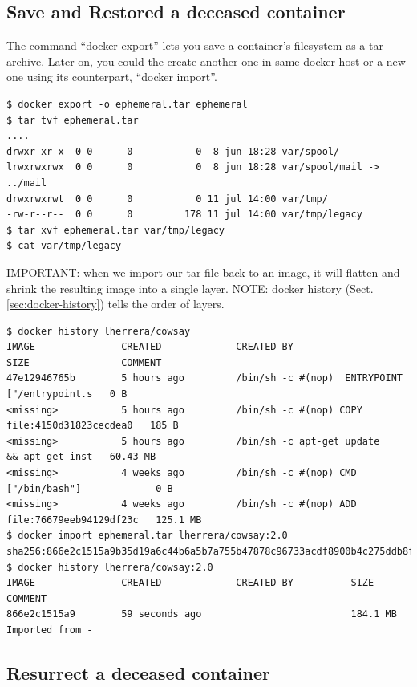 \subsection{Save and Restored a deceased container}


The command “docker export” lets you save a container’s filesystem as a tar
archive. Later on, you could the create another one in same docker host or a new
one using its counterpart, “docker import”.

\begin{verbatim}
$ docker export -o ephemeral.tar ephemeral
$ tar tvf ephemeral.tar 
....
drwxr-xr-x  0 0      0           0  8 jun 18:28 var/spool/
lrwxrwxrwx  0 0      0           0  8 jun 18:28 var/spool/mail -> ../mail
drwxrwxrwt  0 0      0           0 11 jul 14:00 var/tmp/
-rw-r--r--  0 0      0         178 11 jul 14:00 var/tmp/legacy
$ tar xvf ephemeral.tar var/tmp/legacy
$ cat var/tmp/legacy
\end{verbatim}

IMPORTANT:  when we import our tar file back to an image, it will flatten and
shrink the resulting image into a single layer. NOTE: docker history
(Sect.\ref{sec:docker-history}) tells the order of layers.

\begin{verbatim}
$ docker history lherrera/cowsay
IMAGE               CREATED             CREATED BY                                      SIZE                COMMENT
47e12946765b        5 hours ago         /bin/sh -c #(nop)  ENTRYPOINT ["/entrypoint.s   0 B
<missing>           5 hours ago         /bin/sh -c #(nop) COPY file:4150d31823cecdea0   185 B
<missing>           5 hours ago         /bin/sh -c apt-get update     && apt-get inst   60.43 MB
<missing>           4 weeks ago         /bin/sh -c #(nop) CMD ["/bin/bash"]             0 B
<missing>           4 weeks ago         /bin/sh -c #(nop) ADD file:76679eeb94129df23c   125.1 MB
$ docker import ephemeral.tar lherrera/cowsay:2.0
sha256:866e2c1515a9b35d19a6c44b6a5b7a755b47878c96733acdf8900b4c275ddb8f
$ docker history lherrera/cowsay:2.0
IMAGE               CREATED             CREATED BY          SIZE                COMMENT
866e2c1515a9        59 seconds ago                          184.1 MB            Imported from -
\end{verbatim}

\subsection{Resurrect a deceased container}


